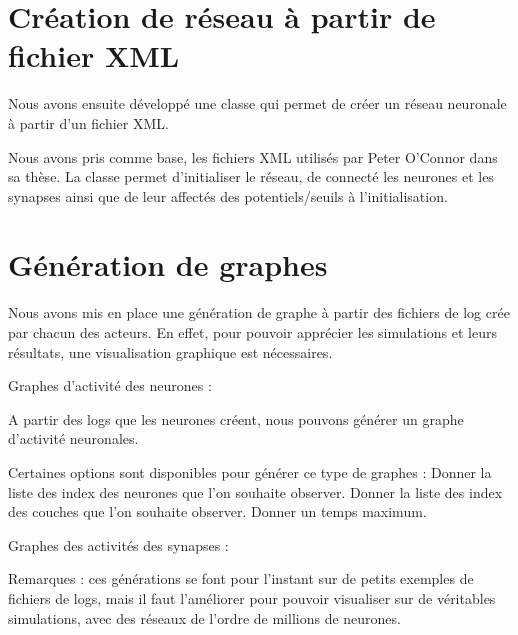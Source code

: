 \documentclass{article}
\begin{document}
\section{Création de réseau à partir de fichier XML}

Nous avons ensuite développé une classe qui permet de créer un réseau neuronale à partir d’un fichier XML.

Nous avons pris comme base, les fichiers XML utilisés par Peter O’Connor dans sa thèse. La classe permet d’initialiser le réseau, de connecté les neurones et les synapses ainsi que de leur affectés des potentiels/seuils à l’initialisation.

\section{Génération de graphes}

    Nous avons mis en place une génération de graphe à partir des fichiers de log crée par chacun des acteurs. En effet, pour pouvoir apprécier les simulations et leurs résultats, une visualisation graphique est nécessaires.

    Graphes d’activité des neurones : 

A partir des logs que les neurones créent, nous pouvons générer un graphe d’activité neuronales. 



Certaines options sont disponibles pour générer ce type de graphes :
Donner la liste des index des neurones que l’on souhaite observer.
Donner la liste des index des couches que l’on souhaite observer.
Donner un temps maximum.


    Graphes des activités des synapses : 


Remarques : ces générations se font pour l’instant sur de petits exemples de fichiers de logs, mais il faut l’améliorer pour pouvoir visualiser sur de véritables simulations, avec des réseaux de l’ordre de millions de neurones.
\end{document}
